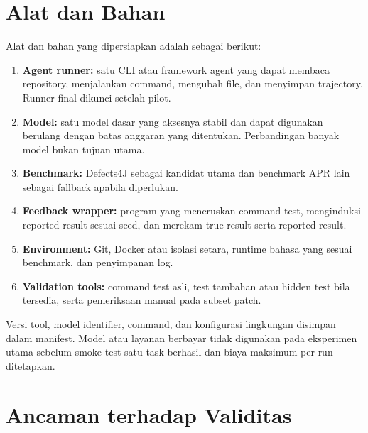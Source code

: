 \section{Alat dan Bahan}

Alat dan bahan yang dipersiapkan adalah sebagai berikut:

\begin{enumerate}[leftmargin=*]
    \item \textbf{Agent runner:} satu CLI atau framework agent yang dapat membaca repository, menjalankan command, mengubah file, dan menyimpan trajectory. Runner final dikunci setelah pilot.
    \item \textbf{Model:} satu model dasar yang aksesnya stabil dan dapat digunakan berulang dengan batas anggaran yang ditentukan. Perbandingan banyak model bukan tujuan utama.
    \item \textbf{Benchmark:} Defects4J sebagai kandidat utama dan benchmark APR lain sebagai fallback apabila diperlukan.
    \item \textbf{Feedback wrapper:} program yang meneruskan command test, menginduksi reported result sesuai seed, dan merekam true result serta reported result.
    \item \textbf{Environment:} Git, Docker atau isolasi setara, runtime bahasa yang sesuai benchmark, dan penyimpanan log.
    \item \textbf{Validation tools:} command test asli, test tambahan atau hidden test bila tersedia, serta pemeriksaan manual pada subset patch.
\end{enumerate}

Versi tool, model identifier, command, dan konfigurasi lingkungan disimpan dalam manifest. Model atau layanan berbayar tidak digunakan pada eksperimen utama sebelum smoke test satu task berhasil dan biaya maksimum per run ditetapkan.

\section{Ancaman terhadap Validitas}


